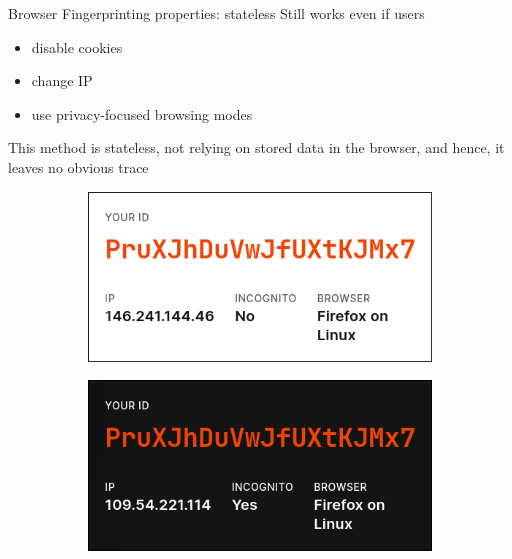 \begin{frame}{Browser Fingerprinting properties: stateless}
  \vspace{-0.5cm}
  Still works even if users
  \begin{itemize}
    \item disable cookies
    \item change IP
    \item use privacy-focused browsing modes
  \end{itemize}
  \smallskip
  This method is stateless, not relying on stored data in the browser, and hence, it leaves no obvious trace

  \begin{figure}
    \centering
    \begin{subfigure}{0.45\textwidth}
      \includegraphics[width=\linewidth]{images/fingerprint-ip-1.png}
    \end{subfigure}
    \begin{subfigure}{0.45\textwidth}
      \includegraphics[width=\linewidth]{images/fingerprint-ip-2.png}
    \end{subfigure}
  \end{figure}
\end{frame}